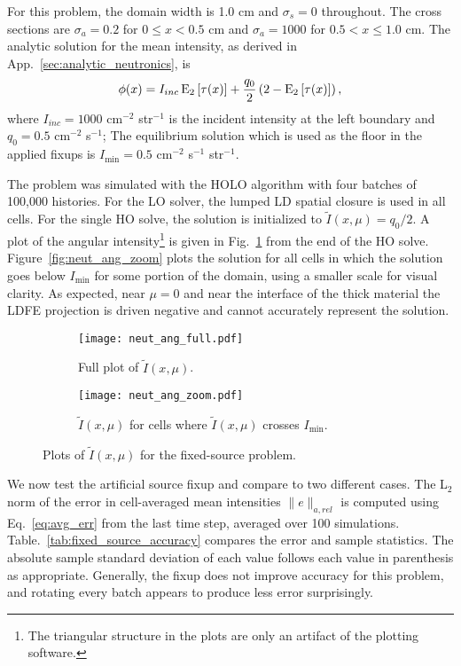 For this problem, the domain width is 1.0 cm and $\sigma_s=0$ throughout.  The cross
sections are $\sigma_a=0.2$ \invcm for $0\leq x <0.5$ cm and $\sigma_a=1000$ for
$0.5<x\leq1.0$ cm.  The analytic solution
for the mean intensity, as derived in App.~\ref{sec:analytic_neutronics}, is
\begin{equation}
    \phi(x) = I_{inc}\operatorname{E}_{2}\left[\tau(x)\right] + \frac{q_0}{2} \left(2 -
    \operatorname{E}_{2}\left[\tau(x)\right]\right),
\end{equation}
where $I_{inc}=1000$ cm$^{-2}$ str$^{-1}$ is the incident intensity at the left
boundary and $q_0 = 0.5$ cm$^{-2}$ s$^{-1}$; The equilibrium solution which is
used as the floor in the applied fixups is $I_{\min} = 0.5$ cm$^{-2}$ s$^{-1}$ str$^{-1}$.

The problem was simulated with the HOLO algorithm with four batches of 100,000 histories.
For the LO solver, the lumped LD spatial closure is used in all cells.
For the single HO solve, the solution is initialized to $\tilde I(x,\mu)=q_0/2$.
A plot of the angular
intensity\footnote{The triangular structure in the plots are only an artifact of the plotting
software.} is given in Fig.~\ref{fig:neut_ang_full} from the end of the HO solve.
Figure~\ref{fig:neut_ang_zoom} plots the solution for all cells in which the solution goes
below $I_{\min}$ for some portion of the domain, using a smaller scale for visual clarity.
As expected, near $\mu=0$ and near the interface of the thick material the LDFE projection
is driven negative and cannot accurately represent the solution.
\begin{figure}[hp]
    \centering
\begin{subfigure}{0.7\textwidth}
  \centering
    \texttt{[image: neut\_ang\_full.pdf]}
    \caption{\label{fig:neut_ang_full} Full plot of $\tilde I(x,\mu)$.}
\end{subfigure}
\begin{subfigure}{0.7\textwidth}
  \centering
  \texttt{[image: neut\_ang\_zoom.pdf]}
  \caption{\label{k_200_compare} $\tilde I(x,\mu)$ for cells where $\tilde I(x,\mu)$
  crosses $I_{\min}$.   }
\end{subfigure}
\caption{Plots of $\tilde I(x,\mu)$ for the fixed-source problem.}
\end{figure}

We now test the artificial source fixup and compare to two different cases.  The L$_2$
norm of the error in cell-averaged mean intensities $\|e\|_{a,rel}$ is computed using
Eq.~\eqref{eq:avg_err} from the last time step, averaged over 100
simulations.  Table.~\ref{tab:fixed_source_accuracy} compares the error and sample
statistics.  The absolute sample standard deviation of each value follows each value in parenthesis 
as appropriate.  Generally, the fixup does not improve accuracy for this problem, and
rotating every batch appears to produce less error surprisingly.

